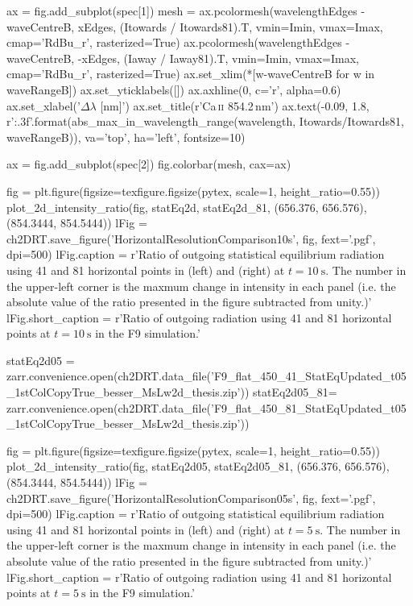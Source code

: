 \begin{pycode}[2DRT]
    ax = fig.add_subplot(spec[1])
    mesh = ax.pcolormesh(wavelengthEdges - waveCentreB, xEdges, (Itowards / Itowards81).T, vmin=Imin, vmax=Imax, cmap='RdBu_r', rasterized=True)
    ax.pcolormesh(wavelengthEdges - waveCentreB, -xEdges, (Iaway / Iaway81).T, vmin=Imin, vmax=Imax, cmap='RdBu_r', rasterized=True)
    ax.set_xlim(*[w-waveCentreB for w in waveRangeB])
    ax.set_yticklabels([])
    ax.axhline(0, c='r', alpha=0.6)
    ax.set_xlabel('$\Delta\lambda$ [nm]')
    ax.set_title(r'Ca\,\textsc{ii} 854.2\,nm')
    ax.text(-0.09, 1.8, r'{:.3f}'.format(abs_max_in_wavelength_range(wavelength,
                                          Itowards/Itowards81, waveRangeB)),
            va='top', ha='left', fontsize=10)

    ax = fig.add_subplot(spec[2])
    fig.colorbar(mesh, cax=ax)

fig = plt.figure(figsize=texfigure.figsize(pytex, scale=1, height_ratio=0.55))
plot_2d_intensity_ratio(fig, statEq2d, statEq2d_81, (656.376, 656.576), (854.3444, 854.5444))
lFig = ch2DRT.save_figure('HorizontalResolutionComparison10s', fig, fext='.pgf', dpi=500)
lFig.caption = r'Ratio of outgoing statistical equilibrium radiation using 41 and 81 horizontal points in \CaLine{} (left) and \Ha{} (right) at $t=\SI{10}{\second}$. The number in the upper-left corner is the maxmum change in intensity in each panel (i.e. the absolute value of the ratio presented in the figure subtracted from unity.)'
lFig.short_caption = r'Ratio of outgoing radiation using 41 and 81 horizontal points at $t=\SI{10}{\second}$ in the F9 simulation.'

statEq2d05 = zarr.convenience.open(ch2DRT.data_file('F9_flat_450_41_StatEqUpdated_t05_1stColCopyTrue_besser_MsLw2d_thesis.zip'))
statEq2d05_81= zarr.convenience.open(ch2DRT.data_file('F9_flat_450_81_StatEqUpdated_t05_1stColCopyTrue_besser_MsLw2d_thesis.zip'))

fig = plt.figure(figsize=texfigure.figsize(pytex, scale=1, height_ratio=0.55))
plot_2d_intensity_ratio(fig, statEq2d05, statEq2d05_81, (656.376, 656.576), (854.3444, 854.5444))
lFig = ch2DRT.save_figure('HorizontalResolutionComparison05s', fig, fext='.pgf', dpi=500)
lFig.caption = r'Ratio of outgoing statistical equilibrium radiation using 41 and 81 horizontal points in \CaLine{} (left) and \Ha{} (right) at $t=\SI{5}{\second}$. The number in the upper-left corner is the maxmum change in intensity in each panel (i.e. the absolute value of the ratio presented in the figure subtracted from unity.)'
lFig.short_caption = r'Ratio of outgoing radiation using 41 and 81 horizontal points at $t=\SI{5}{\second}$ in the F9 simulation.'



\end{pycode}
